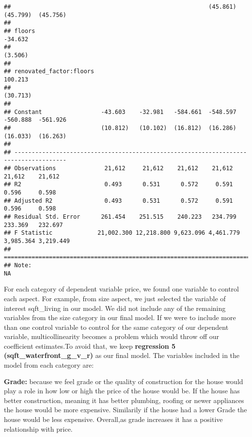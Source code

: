 \documentclass[
]{article}
\begin{document}
\begin{verbatim}
##                                                         (45.861)  (45.799)  (45.756) 
##                                                                                      
## floors                                                                       -34.632 
##                                                                              (3.506) 
##                                                                                      
## renovated_factor:floors                                                      100.213 
##                                                                             (30.713) 
##                                                                                      
## Constant                 -43.603    -32.981   -584.661  -548.597  -560.888  -561.926 
##                          (10.812)   (10.102)  (16.812)  (16.286)  (16.033)  (16.263) 
##                                                                                      
## -------------------------------------------------------------------------------------
## Observations              21,612     21,612    21,612    21,612    21,612    21,612  
## R2                        0.493      0.531      0.572     0.591     0.596     0.598  
## Adjusted R2               0.493      0.531      0.572     0.591     0.596     0.598  
## Residual Std. Error      261.454    251.515    240.223   234.799   233.369   232.697 
## F Statistic             21,002.300 12,218.800 9,623.096 4,461.779 3,985.364 3,219.449
## =====================================================================================
## Note:                                                                              NA
\end{verbatim}

For each category of dependent variable price, we found one variable to
control each aspect. For example, from size aspect, we just selected the
variable of interest sqft\_living in our model. We did not include any
of the remaining variables from the size category in our final model. If
we were to include more than one control variable to control for the
same category of our dependent variable, multicollinearity becomes a
problem which would throw off our coefficient estimates.To avoid that,
we keep \textbf{regression 5 (sqft\_waterfront\_g\_v\_r)} as our final
model. The variables included in the model from each category are:

\textbf{Grade:} because we feel grade or the quality of construction for
the house would play a role in how low or high the price of the house
would be. If the house has better construction, meaning it has better
plumbing, roofing or newer appliances the house would be more expensive.
Similarily if the house had a lower Grade the house would be less
expensive. Overall,as grade increases it has a positive relationship
with price.
\end{document}
